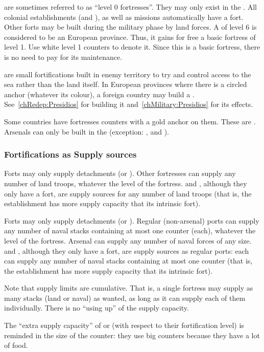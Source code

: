 \aparag[Forts] are sometimes referred to as ``level 0 fortresses''. They may
only exist in the \ROTW.
\bparag All colonial establishments (\COL and \TP), as well as missions
automatically have a fort.
\bparag Other forts may be built during the military phase by land forces.
\bparag A \COL of level 6 is considered to be an European province. Thus, it
gains for free a basic fortress of level 1. Use white level 1 counters to
denote it. Since this is a basic fortress, there is no need to pay for its
maintenance.

\aparag[\Presidios] are small fortifications built in enemy territory to try
and control access to the sea rather than the land itself.
\bparag In European provinces where there is a circled anchor (whatever its
colour), a foreign country may build a
\Presidio. See~\ref{chRedep:Presidios} for building it
and~\ref{chMilitary:Presidios} for its effects.

\aparag[Arsenals.] Some countries have fortresses counters with a gold anchor
on them. These are .
\bparag Arsenals can only be built in the \ROTW (exception:
,  and
).

\subsubsection{Fortifications as Supply sources}
\bparag Forts may only supply detachments (\LD or \LDE).
\bparag Other fortresses can supply any number of land troops, whatever the
level of the fortress.
\bparag \COL and \TP, although they only have a fort, are supply sources for
any number of land troops (that is, the establishment has more supply capacity
that its intrinsic fort).

\bparag Forts may only supply detachments (\ND or \NDE).
\bparag Regular (non-arsenal) ports can supply any number of naval stacks
containing at most one \FLEET counter (each), whatever the level of the
fortress.
\bparag Arsenal can supply any number of naval forces of any size.
\bparag \COL and \TP, although they only have a fort, are supply sources as
regular ports: each can supply any number of naval stacks containing at most
one \FLEET counter (that is, the establishment has more supply capacity that
its intrinsic fort).

\begin{designnote}
  Note that supply limits are cumulative. That is, a single fortress may
  supply as many stacks (land or naval) as wanted, as long as it can supply
  each of them individually. There is no ``using up'' of the supply capacity.

  The ``extra supply capacity'' of \COL or \TP (with respect to their
  fortification level) is reminded in the size of the counter: they use big
  counters because they have a lot of food.
\end{designnote}



